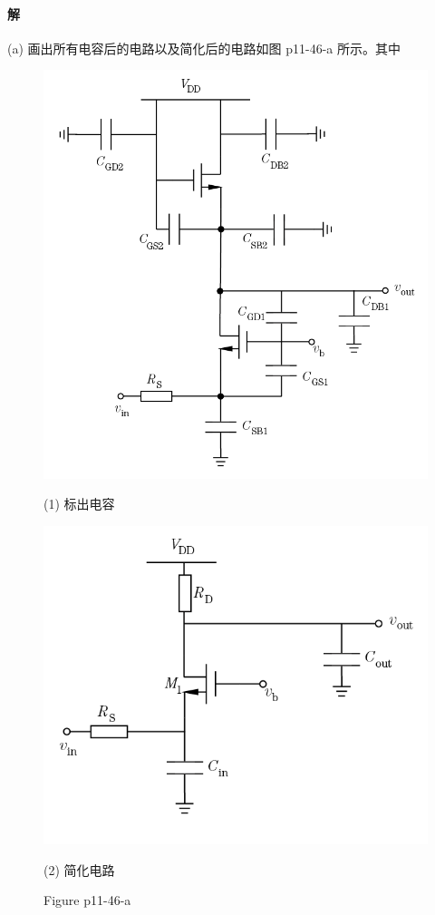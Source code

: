 \documentclass[hyperref, UTF8]{ctexart}
\begin{document}
\paragraph{解}
    (a) 画出所有电容后的电路以及简化后的电路如图 p11-46-a 所示。其中
    \begin{figure}[!htb]
        \centering
        \begin{minipage}[t]{0.481\textwidth}
        \centering
        \includegraphics[width=1\textwidth]{p11-46-a-sol1.png}
        \caption*{(1) 标出电容}
        \end{minipage}
        \begin{minipage}[t]{0.408\textwidth}
        \centering
        \includegraphics[width=1\textwidth]{p11-46-a-sol2.png}
        \caption*{(2) 简化电路}
        \end{minipage}
        \caption*{Figure p11-46-a}
    \end{figure}        
\end{document}

